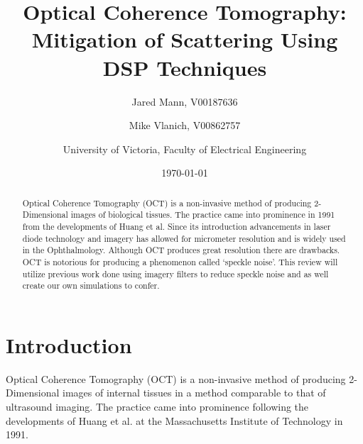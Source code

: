 \documentclass{article}
\begin{document}
	\renewcommand*{\lstlistlistingname}{List of Code}
	\renewcommand*\lstlistingname {Listing}

	\title{Optical Coherence Tomography: \\ Mitigation of Scattering Using DSP Techniques}

	\author{Jared Mann, V00187636}
	\author{Mike Vlanich, V00862757}
	\author{University of Victoria, Faculty of Electrical Engineering}

	\date{\today}%


	\begin{abstract}
Optical Coherence Tomography (OCT) is a non-invasive method of producing 2-Dimensional images of biological tissues. The practice came into prominence in 1991 from the developments of Huang et al. Since its introduction advancements in laser diode technology and imagery has allowed for micrometer resolution and is widely used in the Ophthalmology.\cite{bhende_optical_2018} Although OCT produces great resolution there are drawbacks. OCT is notorious for producing a phenomenon called ‘speckle noise’. This review will utilize previous work done using imagery filters to reduce speckle noise and as well create our own simulations to confer.
	\end{abstract}

	\maketitle
	\tableofcontents
	\makeatletter
	\let\toc@pre\relax
	\let\toc@post\relax
	\makeatother

  	\listoffigures
  	\listoftables


  	\lstlistoflistings


	\section{Introduction}

	Optical Coherence Tomography (OCT) is a non-invasive method of producing 2-Dimensional images of internal tissues in a method comparable to that of ultrasound imaging.\cite{Huang91}\cite{sander_optical_2011} The practice came into prominence following the developments of Huang et al. at the Massachusetts Institute of Technology in 1991. \cite{Huang91}
\end{document}
